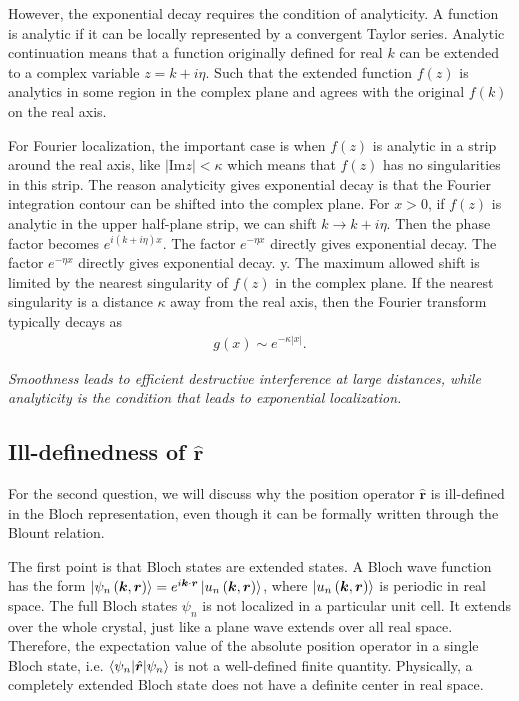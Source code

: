 \documentclass[12pt, oneside]{article}
\newcommand{\mr}[1]{\mathrm{#1}}
\newcommand{\p}[1]{\left(#1\right)}
\newcommand{\bv}[1]{\left|#1\right|}
\numberwithin{equation}{subsection}
\begin{document}
However, the exponential decay requires the condition of analyticity. A function is analytic if it can be locally represented by a convergent Taylor series. Analytic continuation means that a function originally defined for real \(k\) can be extended to a complex variable \(z = k + i \eta\). Such that the extended function \(f\p{z}\) is analytics in some region in the complex plane and agrees with the original \(f \p{k}\) on the real axis. 

For Fourier localization, the important case is when \(f \p{z}\) is analytic in a strip around the real axis, like \(\bv{\mr{Im} z} < \kappa\) which means that \(f \p{z}\) has no singularities in this strip. The  reason analyticity gives exponential decay is that the Fourier integration contour can be shifted into the complex plane.  For \(x >0\), if \(f \p{z}\) is analytic in the upper half-plane strip, we can shift \(k \rightarrow k + i \eta\). Then the phase factor becomes \(e^{ i \p{k + i \eta}x}\). The factor \(e^{- \eta x}\) directly gives exponential decay. The factor \(e^{- \eta x}\) directly gives exponential decay. y. The maximum allowed shift is limited by the nearest singularity of \(f\p{z}\) in the complex plane. If the nearest singularity is a distance \(\kappa\) away from the real axis, then the Fourier transform typically decays as
\begin{align}
	g \p{x} \sim e^{ - \kappa \bv{x}}.
\end{align}

\textit{Smoothness leads to efficient destructive interference at large distances, while analyticity is the condition that leads to exponential localization.}

\vspace{1.5em}

\subsection{\texorpdfstring{Ill-definedness of $\hat{\bm{r}}$}{ Ill-definedness of r}}

For the second question, we will discuss why the position operator \(\hat{\bm{r}}\) is ill-defined in the Bloch representation, even though it can be formally written through the Blount relation. 

The first point is that Bloch states are extended states. A Bloch wave function has the form \(\ket{\psi_{n}\p{\bm{k},\bm{r}}} = e^{i \bm{k}\cdot \bm{r}} \ket{u_{n} \p{\bm{k},\bm{r}}}\), where \(\ket{u_{n} \p{\bm{k},\bm{r}}}\) is periodic in real space. The full Bloch states \(\psi_{n}\) is not localized in a particular unit cell. It extends over the whole crystal, just like a plane wave extends over all real space. Therefore, the expectation value of the absolute position operator in a single Bloch state, i.e. \(\braket{\psi_{n} | \hat{\bm{r}} | \psi_{n}}\) is not a well-defined finite quantity. Physically, a completely extended Bloch state does not have a definite center in real space.
\end{document}
